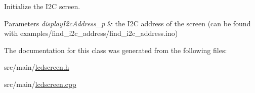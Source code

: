 Initialize the I2C screen. 


\begin{DoxyParams}{Parameters}
{\em display\+I2c\+Address\+\_\+p} & the I2C address of the screen (can be found with examples/find\+\_\+i2c\+\_\+address/find\+\_\+i2c\+\_\+address.\+ino) \\
\hline
\end{DoxyParams}


The documentation for this class was generated from the following files\+:\begin{DoxyCompactItemize}
\item 
src/main/\hyperlink{lcdscreen_8h}{lcdscreen.\+h}\item 
src/main/\hyperlink{lcdscreen_8cpp}{lcdscreen.\+cpp}\end{DoxyCompactItemize}
